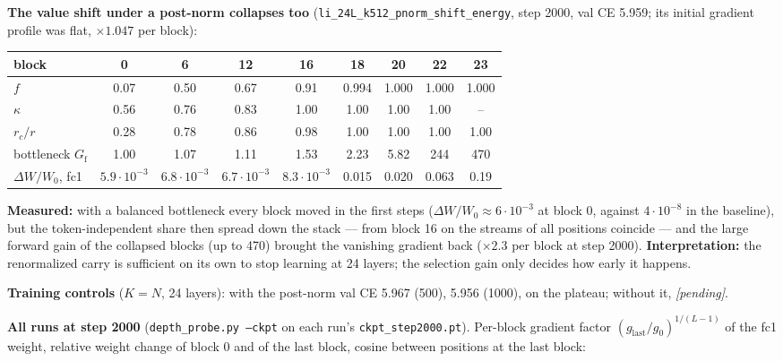 \documentclass[11pt,a4paper]{article}
\newcommand{\code}[1]{\texttt{#1}}
\newcommand{\Gf}{G_{\mathrm{f}}}
\begin{document}
\textbf{The value shift under a post-norm collapses too} (\code{li\_24L\_k512\_pnorm\_shift\_energy},
step 2000, val CE 5.959; its initial gradient profile was flat, \(\times1.047\) per block):

\begin{center}\small
\begin{tabular}{lcccccccc}
\toprule
block & 0 & 6 & 12 & 16 & 18 & 20 & 22 & 23 \\
\midrule
\(f\)                 & 0.07 & 0.50 & 0.67 & 0.91 & 0.994 & 1.000 & 1.000 & 1.000 \\
\(\kappa\)            & 0.56 & 0.76 & 0.83 & 1.00 & 1.00 & 1.00 & 1.00 & -- \\
\(r_c/r\)             & 0.28 & 0.78 & 0.86 & 0.98 & 1.00 & 1.00 & 1.00 & 1.00 \\
bottleneck \(\Gf\)     & 1.00 & 1.07 & 1.11 & 1.53 & 2.23 & 5.82 & 244 & 470 \\
\(\Delta W/W_0\), fc1 & \(5.9\cdot10^{-3}\) & \(6.8\cdot10^{-3}\) & \(6.7\cdot10^{-3}\) & \(8.3\cdot10^{-3}\) & 0.015 & 0.020 & 0.063 & 0.19 \\
\bottomrule
\end{tabular}
\end{center}

\textbf{Measured:} with a balanced bottleneck every block moved in the first steps
(\(\Delta W/W_0\approx6\cdot10^{-3}\) at block 0, against \(4\cdot10^{-8}\) in the
baseline), but the token-independent share then spread down the stack --- from
block 16 on the streams of all positions coincide --- and the large forward gain
of the collapsed blocks (up to 470) brought the vanishing gradient back
(\(\times2.3\) per block at step 2000).  \textbf{Interpretation:} the renormalized
carry is sufficient on its own to stop learning at 24 layers; the selection gain
only decides how early it happens.

\textbf{Training controls} (\(K=N\), 24 layers): with the post-norm val CE
5.967 (500), 5.956 (1000), on the plateau; without it, \emph{[pending]}.

\textbf{All runs at step 2000} (\code{depth\_probe.py --ckpt} on each run's \code{ckpt\_step2000.pt}).
Per-block gradient factor \((g_{\mathrm{last}}/g_0)^{1/(L-1)}\) of the fc1
weight, relative weight change of block 0 and of the last block, cosine between positions at the last
block:
\end{document}
